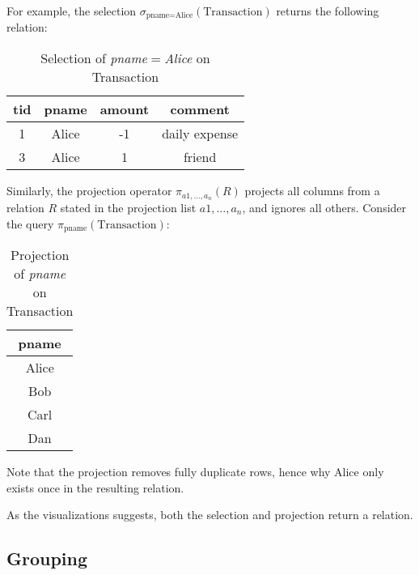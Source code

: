 For example, the selection $\sigma_{\text{pname}=\text{Alice}}(\text{Transaction})$
returns the following relation:

\begin{table}[htbp]
    \centering
    \begin{tabular}{|c|c|c|c|}
        \hline
        tid     & pname & amount    & comment \\ \hline\hline
        1       & Alice & -1        & daily expense \\ \hline
        3       & Alice & 1         & friend\\ \hline
    \end{tabular}
    \caption{Selection of \textit{pname$=$Alice} on Transaction}
\end{table}

Similarly, the projection operator $\pi_{a1, \dots, a_n}(R)$ projects all columns
from a relation $R$ stated in the projection list $a1, \dots, a_n$, and
ignores all others. Consider the query $\pi_{\text{pname}}(\text{Transaction})$:

\begin{table}[htbp]
    \centering
    \begin{tabular}{|c|}
        \hline
        pname \\ \hline\hline
        Alice \\ \hline
        Bob   \\ \hline
        Carl  \\ \hline
        Dan   \\ \hline
    \end{tabular}
    \caption{Projection of \textit{pname} on Transaction}
\end{table}

Note that the projection removes fully duplicate rows, hence why Alice only exists once in
the resulting relation.

As the visualizations suggests, both the selection and projection return a relation.

\subsection{Grouping} \label{Grouping}



